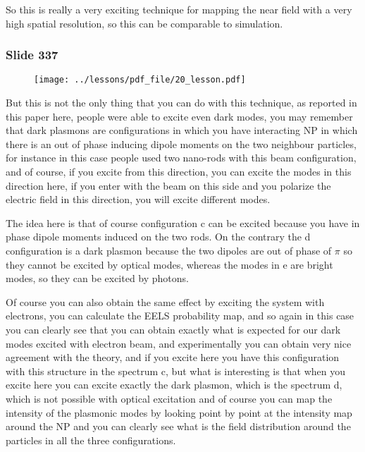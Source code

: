 \documentclass[../main/main.tex]{subfiles}
\begin{document}
So this is really a very exciting technique for mapping the near field with a very high spatial resolution, so this can be comparable to simulation. 

\newpage

\subsubsection{Slide 337}

\begin{figure}[h!]
\centering
\texttt{[image: ../lessons/pdf\_file/20\_lesson.pdf]}
\end{figure}

But this is not the only thing that you can do with this technique, as reported in this paper here, people were able to excite even dark modes, you may remember that dark plasmons are configurations in which you have interacting NP in which there is an out of phase inducing dipole moments on the two neighbour particles, for instance in this case people used two nano-rods with this beam configuration, and of course, if you excite from this direction, you can excite the modes in this direction here, if you enter with the beam on this side and you polarize the electric field in this direction, you will excite different modes.

The idea here is that of course configuration c can be excited because you have in phase dipole moments induced on the two rods. On the contrary the d configuration is a dark plasmon because the two dipoles are out of phase of $\pi$ so they cannot be excited by optical modes, whereas the modes in e are bright modes, so they can be excited by photons.

Of course you can also obtain the same effect by exciting the system with electrons, you can calculate the EELS probability map, and so again in this case you can clearly see that you can obtain exactly what is expected for our dark modes excited with electron beam, and experimentally you can obtain very nice agreement with the theory, and if you excite here you have this configuration with this structure in the spectrum c, but what is interesting is that when you excite here you can excite exactly the dark plasmon, which is the spectrum d, which is not possible with optical excitation and of course you can map the intensity of the plasmonic modes by looking point by point at the intensity map around the NP and you can clearly see what is the field distribution around the particles in all the three configurations.
\end{document}
